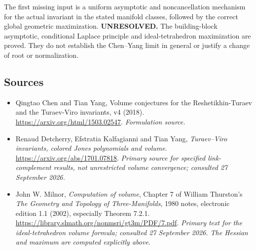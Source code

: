 \documentclass[11pt]{article}
\begin{document}
The first missing input is a uniform
asymptotic and noncancellation mechanism
for the actual invariant in the stated
manifold classes, followed by the correct
global geometric maximization.
\textbf{UNRESOLVED.} The building-block
asymptotic, conditional Laplace principle
and ideal-tetrahedron maximization are
proved. They do not establish the
Chen--Yang limit in general or justify
a change of root or normalization.

\subsection{Sources}
\begin{itemize}
\item[S1]Qingtao Chen and Tian Yang, Volume conjectures for the Reshetikhin-Turaev and the Turaev-Viro invariants, v4 (2018).
\url{https://arxiv.org/html/1503.02547}.
\textit{Formulation source.}
\item[E1]Renaud Detcherry, Efstratia Kalfagianni and Tian Yang, \emph{Turaev--Viro invariants, colored Jones polynomials and volume}.
\url{https://arxiv.org/abs/1701.07818}.
\textit{Primary source for specified link-complement results, not unrestricted volume convergence; consulted 27 September 2026.}
\item[E2]John W. Milnor, \emph{Computation of volume}, Chapter 7 of William Thurston's \emph{The Geometry and Topology of Three-Manifolds}, 1980 notes, electronic edition 1.1 (2002), especially Theorem 7.2.1.
\url{https://library.slmath.org/nonmsri/gt3m/PDF/7.pdf}.
\textit{Primary text for the ideal-tetrahedron volume formula; consulted 27 September 2026. The Hessian and maximum are computed explicitly above.}
\end{itemize}
\end{document}
